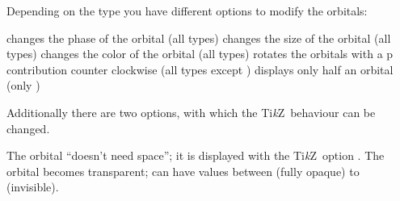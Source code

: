\documentclass[load-preamble+]{cnltx-doc}
\newcommand*\TikZ{Ti\textit{k}Z}
\begin{document}
\begin{example}
      
\end{example}

Depending on the type you have different options to modify the orbitals:
\begin{options}
  \Default{+}
    changes the phase of the orbital (all types)
    changes the size of the orbital (all types)
    changes the color of the orbital (all types)
    rotates the orbitals with a p contribution counter clockwise (all types
    except )
    displays only half an orbital (only )
\end{options}

\begin{example}
    
   
   
 
   
   
\end{example}

Additionally there are two options, with which the \TikZ\ behaviour can be
changed.
\begin{options}
    The orbital \enquote{doesn't need space}; it is displayed with the \TikZ\
    option .
    The orbital becomes transparent;  can have values between
    \code{1} (fully opaque) to \code{0} (invisible).
\end{options}
\begin{example}
  \vspace{7mm}
  \setbondoffset{0pt}
  \vspace{7mm}
\end{example}

\begin{example}
  \vspace{7mm}
  \setbondoffset{0pt}
  \vspace{1cm}
\end{example}
\end{document}
